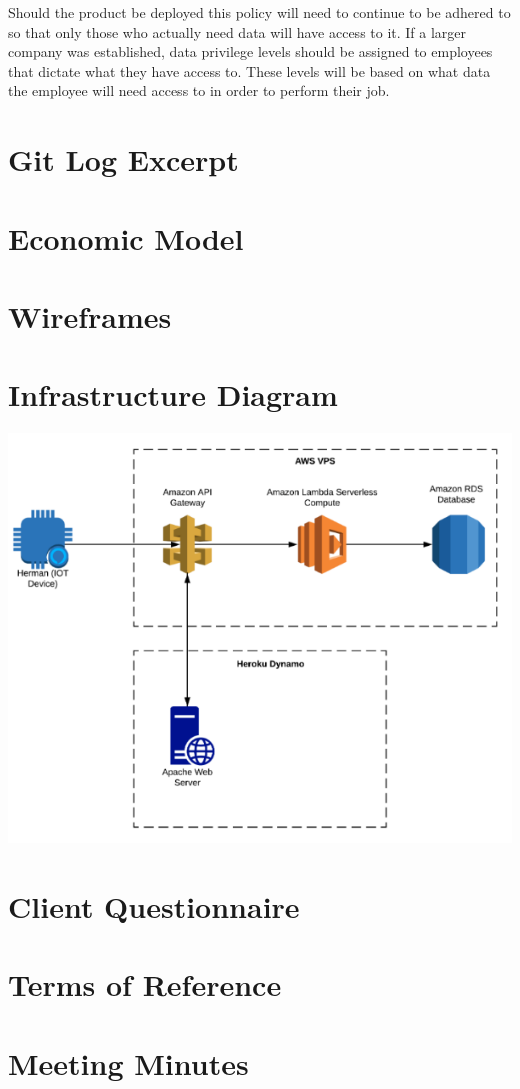 \documentclass[]{report}
\begin{document}
Should the product be deployed this policy will need to continue to be adhered to so that only those who actually need data will have access to it. If a larger company was established, data privilege levels should be assigned to employees that dictate what they have access to. These levels will be based on what data the employee will need access to in order to perform their job.

	
	
	\newpage
	\begin{appendices}
		\chapter{Git Log Excerpt}
		\label{appendix:gitlog}
		
		\chapter{Economic Model}
		\label{appendix:economicmodel}
		
		\chapter{Wireframes}
		\label{appendix:wireframes}
		
		\chapter{Infrastructure Diagram}
		\label{appendix:infrastructurediagram}
		\includegraphics{awsmodel.png}
		\chapter{Client Questionnaire}
		\label{appendix:questionnaire}
		
		\chapter{Terms of Reference}
		\label{appendix:tor}
		
		\chapter{Meeting Minutes}
		\label{appendix:meetingsMinutes}
		
	\end{appendices}
\end{document}
